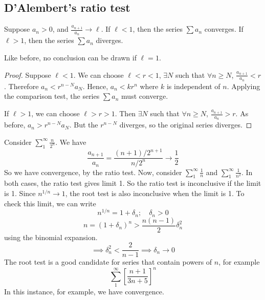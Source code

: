 \subsection{D'Alembert's ratio test}
\begin{theorem}
	Suppose \(a_n > 0\), and \(\frac{a_{n+1}}{a_n} \to \ell\).
	If \(\ell < 1\), then the series \(\sum a_n\) converges.
	If \(\ell > 1\), then the series \(\sum a_n\) diverges.
\end{theorem}
\begin{remark}
	Like before, no conclusion can be drawn if \(\ell = 1\).
\end{remark}
\begin{proof}
	Suppose \(\ell < 1\).
	We can choose \(\ell < r < 1\), \(\exists N\) such that \(\forall n \geq N\), \(\frac{a_{n+1}}{a_n} < r\).
	Therefore \(a_n < r^{n-N} a_N\).
	Hence, \(a_n < k r^n\) where \(k\) is independent of \(n\).
	Applying the comparison test, the series \(\sum a_n\) must converge.

	If \(\ell > 1\), we can choose \(\ell > r > 1\).
	Then \(\exists N\) such that \(\forall n \geq N\), \(\frac{a_{n+1}}{a_n} > r\).
	As before, \(a_n > r^{n-N} a_N\).
	But the \(r^{n-N}\) diverges, so the original series diverges.
\end{proof}

\begin{example}
Consider \(\sum_1^\infty \frac{n}{2^n}\).
We have
\[
	\frac{a_{n+1}}{a_n} = \frac{(n+1)/2^{n+1}}{n/2^n} \to \frac{1}{2}
\]
So we have convergence, by the ratio test.
Now, consider \(\sum_1^\infty \frac{1}{n}\) and \(\sum_1^\infty \frac{1}{n^2}\).
In both cases, the ratio test gives limit 1.
So the ratio test is inconclusive if the limit is 1.
Since \(n^{1/n} \to 1\), the root test is also inconclusive when the limit is 1.
To check this limit, we can write
\[
	n^{1/n} = 1 + \delta_n;\quad \delta_n > 0
\]
\[
	n = (1 + \delta_n)^n > \frac{n(n-1)}{2}\delta_n^2
\]
using the binomial expansion.
\[
	\implies \delta_n^2 < \frac{2}{n-1} \implies \delta_n \to 0
\]
The root test is a good candidate for series that contain powers of \(n\), for example
\[
	\sum_1^\infty \left[ \frac{n+1}{3n+5} \right]^n
\]
In this instance, for example, we have convergence.
\end{example}

